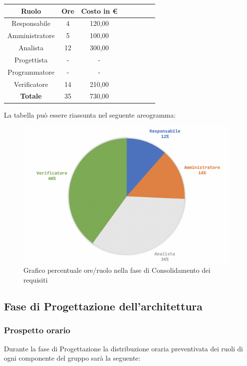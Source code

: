 			\begin{longtable}{|c|c|c|c|c|c|c|c}
				\hline
				\rowcolor{lighter-grayer}
				\textbf{Ruolo} & \textbf{Ore} & \textbf{Costo in €} \\
				\hline
				\endfirsthead
				
				\hline
				Responsabile & 4 & 120,00\\
				\hline
				\hline
				Amministratore & 5 & 100,00\\
				\hline
				\hline
				Analista & 12 & 300,00\\
				\hline
				\hline
				Progettista & - & -\\
				\hline
				\hline
				Programmatore & -  & -\\
				\hline
				\hline
				Verificatore & 14 & 210,00\\
				\hline
				\textbf{Totale} & 35 & 730,00\\
				\hline
				
			\end{longtable}
			\pagebreak
			
			La tabella può essere riassunta nel seguente areogramma:
			\begin{figure}[H]
				\centering
				\includegraphics[width=0.8\linewidth]{./images/consRequisiti2.png}
				\caption{Grafico percentuale ore/ruolo nella fase di Consolidamento dei requisiti}
				\label{fig:grafico costi ruolo fase Consolidamento dei requisiti}
			\end{figure}
	
	\subsection{Fase di Progettazione dell'architettura}
		\subsubsection{Prospetto orario}
		Durante la fase di Progettazione la distribuzione oraria preventivata dei ruoli di ogni componente del gruppo sarà la seguente:
		
